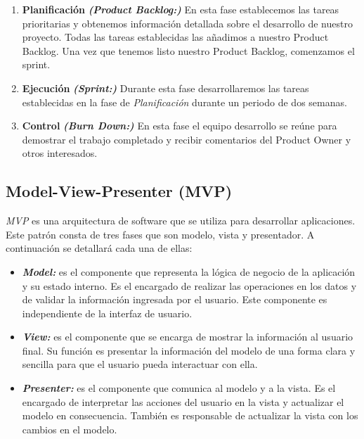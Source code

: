 \begin{enumerate}
    \item \textbf{Planificación} \textbf{\textit{(Product Backlog:)}} En esta fase establecemos las tareas prioritarias y obtenemos información detallada sobre el desarrollo de nuestro proyecto.
    Todas las tareas establecidas las añadimos a nuestro Product Backlog. Una vez que tenemos listo nuestro Product Backlog, comenzamos el sprint. 
     
    \item \textbf{Ejecución} \textbf{\textit{(Sprint:)}} Durante esta fase desarrollaremos las tareas establecidas en la fase de \textit{Planificación} durante un periodo de dos semanas.
    \item \textbf{Control} \textbf{\textit{(Burn Down:)}} En esta fase el equipo desarrollo se reúne para demostrar el trabajo completado y recibir comentarios del Product Owner y otros interesados.
\end{enumerate}

\subsection{Model-View-Presenter (MVP)}
\textit{MVP} es una arquitectura de software que se utiliza para desarrollar aplicaciones. Este patrón consta de tres fases que son modelo, vista y presentador. A continuación se detallará cada una de ellas: 

\begin{itemize}
    \item 
    \textit{\textbf{Model:}} es el componente que representa la lógica de negocio de la aplicación y su estado interno. Es el encargado de realizar las operaciones en los datos y de validar la información ingresada por el usuario. Este componente es independiente de la interfaz de usuario.
     \item 
    \textit{\textbf{View:}} es el componente que se encarga de mostrar la información al usuario final. Su función es presentar la información del modelo de una forma clara y sencilla para que el usuario pueda interactuar con ella.
     \item  
    \textit{\textbf{Presenter:}} es el componente que comunica al modelo y a la vista. Es el encargado de interpretar las acciones del usuario en la vista y actualizar el modelo en consecuencia. También es responsable de actualizar la vista con los cambios en el modelo.
\end{itemize}



